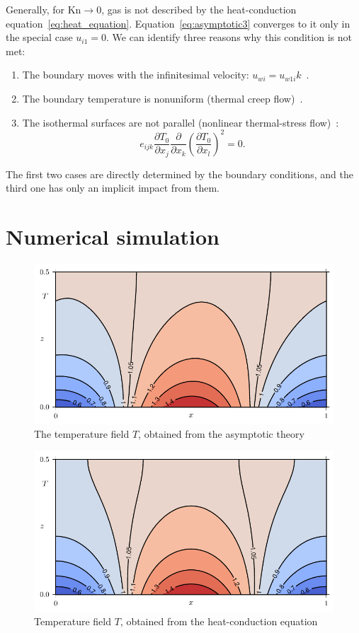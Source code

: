 \documentclass[smallextended, referee]{svjour3} %
\newcommand{\Kn}{\mathrm{Kn}}
\newcommand{\pder}[2][]{\frac{\partial#1}{\partial#2}}
\begin{document}
Generally, for \(\Kn\to0\), gas is not described by the heat-conduction equation~\eqref{eq:heat_equation}.
Equation~\eqref{eq:asymptotic3} converges to it only in the special case \(u_{i1} = 0\).
We can identify three reasons why this condition is not met:
\begin{enumerate}
	\item The boundary moves with the infinitesimal velocity: \(u_{wi} = u_{w1i} k\)~\cite{GhostEffect}.
	\item The boundary temperature is nonuniform (thermal creep flow)~\cite{GhostEffect}.
	\item The isothermal surfaces are not parallel (nonlinear thermal-stress flow)~\cite{Kogan1976}:
		\begin{equation}\label{eq:equilibrium}
			e_{ijk}\pder[T_0]{x_j}\pder{x_k}\left(\pder[T_0]{x_l}\right)^2 = 0.
		\end{equation}
\end{enumerate}

The first two cases are directly determined by the boundary conditions,
and the third one has only an implicit impact from them.

\section{Numerical simulation}

\begin{figure}[ht]
	\centering
	\includegraphics{Fig3}
	\caption{The temperature field \(T\), obtained from the asymptotic theory}
	\label{fig:moving:T_asym}
\end{figure}

\begin{figure}[ht]
	\centering
	\includegraphics{Fig4}
	\caption{Temperature field \(T\), obtained from the heat-conduction equation}
	\label{fig:moving:T_heat}
\end{figure}
\end{document}
